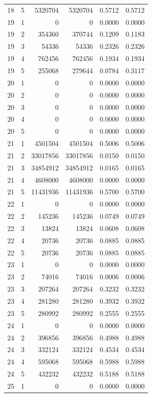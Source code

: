 \begin{longtable}{rrrrrr}
18 & 5 & 5320704 & 5320704 & 0.5712 & 0.5712 \\
19 & 1 & 0 & 0 & 0.0000 & 0.0000 \\
19 & 2 & 354360 & 370744 & 0.1209 & 0.1183 \\
19 & 3 & 54336 & 54336 & 0.2326 & 0.2326 \\
19 & 4 & 762456 & 762456 & 0.1934 & 0.1934 \\
19 & 5 & 255068 & 279644 & 0.0784 & 0.3117 \\
20 & 1 & 0 & 0 & 0.0000 & 0.0000 \\
20 & 2 & 0 & 0 & 0.0000 & 0.0000 \\
20 & 3 & 0 & 0 & 0.0000 & 0.0000 \\
20 & 4 & 0 & 0 & 0.0000 & 0.0000 \\
20 & 5 & 0 & 0 & 0.0000 & 0.0000 \\
21 & 1 & 4501504 & 4501504 & 0.5006 & 0.5006 \\
21 & 2 & 33017856 & 33017856 & 0.0150 & 0.0150 \\
21 & 3 & 34854912 & 34854912 & 0.0165 & 0.0165 \\
21 & 4 & 4608000 & 4608000 & 0.0000 & 0.0000 \\
21 & 5 & 11431936 & 11431936 & 0.5700 & 0.5700 \\
22 & 1 & 0 & 0 & 0.0000 & 0.0000 \\
22 & 2 & 145236 & 145236 & 0.0749 & 0.0749 \\
22 & 3 & 13824 & 13824 & 0.0608 & 0.0608 \\
22 & 4 & 20736 & 20736 & 0.0885 & 0.0885 \\
22 & 5 & 20736 & 20736 & 0.0885 & 0.0885 \\
23 & 1 & 0 & 0 & 0.0000 & 0.0000 \\
23 & 2 & 74016 & 74016 & 0.0006 & 0.0006 \\
23 & 3 & 207264 & 207264 & 0.3232 & 0.3232 \\
23 & 4 & 281280 & 281280 & 0.3932 & 0.3932 \\
23 & 5 & 280992 & 280992 & 0.2555 & 0.2555 \\
24 & 1 & 0 & 0 & 0.0000 & 0.0000 \\
24 & 2 & 396856 & 396856 & 0.4988 & 0.4988 \\
24 & 3 & 332124 & 332124 & 0.4534 & 0.4534 \\
24 & 4 & 595068 & 595068 & 0.5988 & 0.5988 \\
24 & 5 & 432232 & 432232 & 0.5188 & 0.5188 \\
25 & 1 & 0 & 0 & 0.0000 & 0.0000 \\

\end{longtable}
